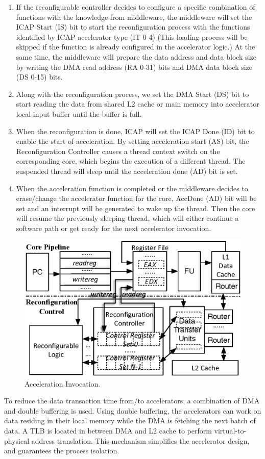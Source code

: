 \begin{enumerate}
\item If the reconfigurable controller decides to configure a specific
  combination of functions with the knowledge from middleware, the
  middleware will set the ICAP Start (IS) bit to start the
  reconfiguration process with the functions identified by ICAP
  accelerator type (IT 0-4) (This loading process will be skipped if
  the function is already configured in the accelerator logic.) At the
  same time, the middleware will prepare the data address and data
  block size by writing the DMA read address (RA 0-31) bits and DMA
  data block size (DS 0-15) bits.

\item Along with the reconfiguration process, we set the DMA Start
  (DS) bit to start reading the data from shared L2 cache or main
  memory into accelerator local input buffer until the buffer is full.

\item When the reconfiguration is done, ICAP will set the ICAP Done
  (ID) bit to enable the start of acceleration. By setting
  acceleration start (AS) bit, the Reconfiguration Controller causes a
  thread context switch on the corresponding core, which begins the
  execution of a different thread. The suspended thread will sleep
  until the acceleration done (AD) bit is set.

\item When the acceleration function is completed or the middleware
  decides to erase/change the accelerator function for the core,
  AccDone (AD) bit will be set and an interrupt will be generated to
  wake up the thread. Then the core will resume the previously
  sleeping thread, which will either continue a software path or get
  ready for the next accelerator invocation.
\end{enumerate}


\begin{figure}
    \centering
    \includegraphics[width=4.0 in]{HPCA14-Acceleration_Invocation}
    \caption{Acceleration Invocation.}
    \label{fig_Acc_Invoc}
\end{figure}


To reduce the data transaction time from/to accelerators, a
combination of DMA and double buffering is used. 
Using double buffering, the accelerators can work on data residing in
their local memory while the DMA is fetching the next batch of data. A
TLB is located in between DMA and L2 cache to perform
virtual-to-physical address translation. This mechanism simplifies the
accelerator design, and guarantees the process isolation.
